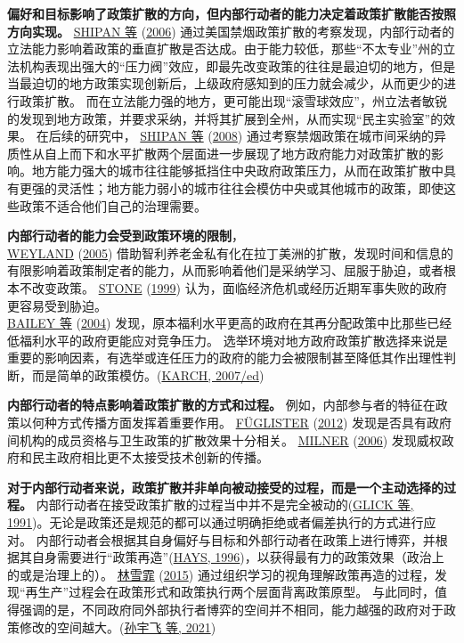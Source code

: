 \documentclass[
  12pt,
]{ctexart}
\begin{document}
\textbf{偏好和目标影响了政策扩散的方向，但内部行动者的能力决定着政策扩散能否按照方向实现。}
\protect\hyperlink{ref-ShipanVolden2006}{SHIPAN 等} (\protect\hyperlink{ref-ShipanVolden2006}{2006}) 通过美国禁烟政策扩散的考察发现，内部行动者的立法能力影响着政策的垂直扩散是否达成。由于能力较低，那些``不太专业''州的立法机构表现出强大的``压力阀''效应，即最先改变政策的往往是最迫切的地方，但是当最迫切的地方政策实现创新后，上级政府感知到的压力就会减少，从而更少的进行政策扩散。
而在立法能力强的地方，更可能出现``滚雪球效应''，州立法者敏锐的发现到地方政策，并要求采纳，并将其扩展到全州，从而实现``民主实验室''的效果。
在后续的研究中， \protect\hyperlink{ref-ShipanVolden2008}{SHIPAN 等} (\protect\hyperlink{ref-ShipanVolden2008}{2008}) 通过考察禁烟政策在城市间采纳的异质性从自上而下和水平扩散两个层面进一步展现了地方政府能力对政策扩散的影响。地方能力强大的城市往往能够抵挡住中央政府政策压力，从而在政策扩散中具有更强的灵活性；地方能力弱小的城市往往会模仿中央或其他城市的政策，即使这些政策不适合他们自己的治理需要。

\textbf{内部行动者的能力会受到政策环境的限制}，\\
\protect\hyperlink{ref-Weyland2005a}{WEYLAND} (\protect\hyperlink{ref-Weyland2005a}{2005}) 借助智利养老金私有化在拉丁美洲的扩散，发现时间和信息的有限影响着政策制定者的能力，从而影响着他们是采纳学习、屈服于胁迫，或者根本不改变政策。
\protect\hyperlink{ref-Stone1999}{STONE} (\protect\hyperlink{ref-Stone1999}{1999}) 认为，面临经济危机或经历近期军事失败的政府更容易受到胁迫。\\
\protect\hyperlink{ref-BaileyRom2004}{BAILEY 等} (\protect\hyperlink{ref-BaileyRom2004}{2004}) 发现，原本福利水平更高的政府在其再分配政策中比那些已经低福利水平的政府更能应对竞争压力。
选举环境对地方政府政策扩散选择来说是重要的影响因素，有选举或连任压力的政府的能力会被限制甚至降低其作出理性判断，而是简单的政策模仿。(\protect\hyperlink{ref-Karch2007a}{KARCH, 2007/ed})

\textbf{内部行动者的特点影响着政策扩散的方式和过程。}
例如，内部参与者的特征在政策以何种方式传播方面发挥着重要作用。
\protect\hyperlink{ref-Fuglister2012}{FÜGLISTER} (\protect\hyperlink{ref-Fuglister2012}{2012}) 发现是否具有政府间机构的成员资格与卫生政策的扩散效果十分相关。
\protect\hyperlink{ref-Milner2006}{MILNER} (\protect\hyperlink{ref-Milner2006}{2006}) 发现威权政府和民主政府相比更不太接受技术创新的传播。

\textbf{对于内部行动者来说，政策扩散并非单向被动接受的过程，而是一个主动选择的过程。}
内部行动者在接受政策扩散的过程当中并不是完全被动的(\protect\hyperlink{ref-GlickHays1991}{GLICK 等, 1991})。无论是政策还是规范的都可以通过明确拒绝或者偏差执行的方式进行应对。
内部行动者会根据其自身偏好与目标和外部行动者在政策上进行博弈，并根据其自身需要进行``政策再造''(\protect\hyperlink{ref-Hays1996}{HAYS, 1996})，以获得最有力的政策效果（政治上的或是治理上的）。
\protect\hyperlink{ref-LinXueFei2015}{林雪霏} (\protect\hyperlink{ref-LinXueFei2015}{2015}) 通过组织学习的视角理解政策再造的过程，发现``再生产''过程会在政策形式和政策执行两个层面背离政策原型。
与此同时，值得强调的是，不同政府同外部执行者博弈的空间并不相同，能力越强的政府对于政策修改的空间越大。(\protect\hyperlink{ref-SunYuFeiYangXueDong2021}{孙宇飞 等, 2021})
\end{document}
